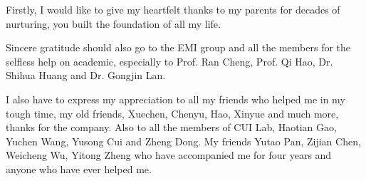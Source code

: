 Firstly, I would like to give my heartfelt thanks to my parents for decades of nurturing, you built the foundation of all my life.

Sincere gratitude should also go to the EMI group and all the members for the selfless help on academic, especially to Prof. Ran Cheng, Prof. Qi Hao, Dr. Shihua Huang and Dr. Gongjin Lan.

I also have to express my appreciation to all my friends who helped me in my tough time, my old friends, Xuechen, Chenyu, Hao, Xinyue and much more, thanks for the company. Also to all the members of CUI Lab, Haotian Gao, Yuchen Wang, Yusong Cui and Zheng Dong. My friends Yutao Pan, Zijian Chen, Weicheng Wu, Yitong Zheng who have accompanied me for four years and anyone who have ever helped me.



